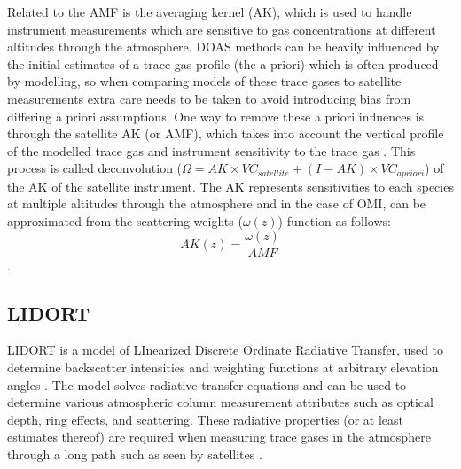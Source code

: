     Related to the AMF is the averaging kernel (AK), which is used to handle instrument measurements which are sensitive to gas concentrations at different altitudes through the atmosphere.
    DOAS methods can be heavily influenced by the initial estimates of a trace gas profile (the a priori) which is often produced by modelling, so when comparing models of these trace gases to satellite measurements extra care needs to be taken to avoid introducing bias from differing a priori assumptions.
    One way to remove these a priori influences is through the satellite AK (or AMF), which takes into account the vertical profile of the modelled trace gas and instrument sensitivity to the trace gas \parencite{Eskes2003, Palmer2001}.
    This process is called deconvolution ($\Omega = AK \times VC_{satellite} + (I - AK) \times  VC_{a priori}$) of the AK of the satellite instrument.
    The AK represents sensitivities to each species at multiple altitudes through the atmosphere and in the case of OMI, can be approximated from the scattering weights ($\omega(z)$) function as follows:
    \begin{equation} \label{ch_HCHO:eqn:AKfromw}
    AK(z) = \frac{\omega(z)}{AMF}
    \end{equation}
    \parencite{Abad2015}.
  
  \subsection{LIDORT}
    \label{Model:Meas:sat:LIDORT}
    
    LIDORT is a model of LInearized Discrete Ordinate Radiative Transfer, used to determine backscatter intensities and weighting functions at arbitrary elevation angles \parencite{Spurr2001}.
    The model solves radiative transfer equations and can be used to determine various atmospheric column measurement attributes such as optical depth, ring effects, and scattering.
    These radiative properties (or at least estimates thereof) are required when measuring trace gases in the atmosphere through a long path such as seen by satellites \parencite[e.g.,][]{Palmer2001,Martin2002a,DeSmedt2015,Abad2015}.
  
